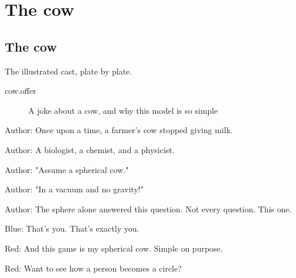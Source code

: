 
\section{The cow}\label{act:cow}

\subsection{The cow}\label{cow}

The illustrated cast, plate by plate.


\begin{description}
  \item[cow.offer] A joke about a cow, and why this model is so simple
\end{description}



Author: Once upon a time,
a farmer's cow stopped giving milk.

Author: A biologist, a chemist, and a physicist.

Author: "Assume a spherical cow."

Author: "In a vacuum and no gravity!"

Author: The sphere alone answered this question.
Not every question. This one.


Blue: That's you. That's exactly you.

Red: And this game is my spherical cow. Simple on purpose.

Red: Want to see how a person becomes a circle?

